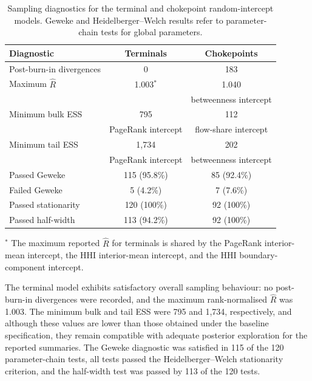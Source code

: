 \documentclass[pdftex,12pt,openright,a4paper,oneside]{book}
\begin{document}
\begin{table}[htbp]
\centering
\caption{Sampling diagnostics for the terminal and chokepoint
random-intercept models. Geweke and Heidelberger--Welch
results refer to parameter-chain tests for global parameters.}
\label{tab:node_sampling_diagnostics}
\small
\begin{tabular}{lcc}
\hline
Diagnostic & Terminals & Chokepoints \\
\hline

Post-burn-in divergences & 0 & 183 \\

Maximum $\widehat{R}$
& 1.003$^{*}$ & 1.040 \\
& & \scriptsize{betweenness intercept} \\

Minimum bulk ESS
& 795 & 112 \\
& \scriptsize{PageRank intercept}
& \scriptsize{flow-share intercept} \\

Minimum tail ESS
& 1,734 & 202 \\
& \scriptsize{PageRank intercept}
& \scriptsize{betweenness intercept} \\

\hline

Passed Geweke & 115 (95.8\%) & 85 (92.4\%) \\
Failed Geweke & 5 (4.2\%) & 7 (7.6\%) \\

\hline

Passed stationarity & 120 (100\%) & 92 (100\%) \\
Passed half-width & 113 (94.2\%) & 92 (100\%) \\

\hline
\end{tabular}

\vspace{0.2cm}
\begin{minipage}{0.95\textwidth}
\footnotesize
$^{*}$ The maximum reported $\widehat{R}$ for terminals
is shared by the PageRank interior-mean intercept,
the HHI interior-mean intercept, and the HHI
boundary-component intercept.
\end{minipage}

\end{table}

The terminal model exhibits
satisfactory overall sampling
behaviour: no post-burn-in divergences
were recorded, and the maximum
rank-normalised $\widehat{R}$
was 1.003.
The minimum bulk and tail ESS
were 795 and 1,734, respectively, and although these values are lower
than those obtained under the
baseline specification, they
remain compatible with adequate
posterior exploration for the
reported summaries.
The Geweke diagnostic was
satisfied in 115 of the 120
parameter-chain tests, all tests passed the
Heidelberger--Welch stationarity criterion, and the half-width test was
passed by 113 of the 120 tests.
\end{document}
